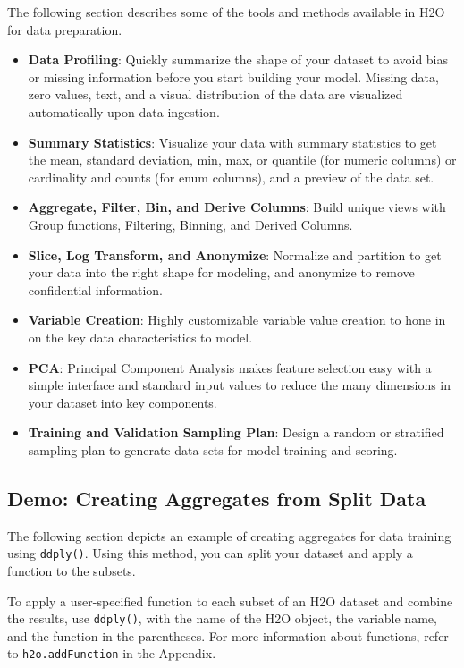 The following section describes some of the tools and methods available in H2O for data preparation. 
\begin{itemize}
\item {\textbf{Data Profiling}}: Quickly summarize the shape of your dataset to avoid bias or missing information before you start building your model. Missing data, zero values, text, and a visual distribution of the data are visualized automatically upon data ingestion. 
\item {\textbf{Summary Statistics}}: Visualize your data with summary statistics to get the mean, standard deviation, min, max, or quantile (for numeric columns) or cardinality and counts (for enum columns), and a preview of the data set. 
\item {\textbf{Aggregate, Filter, Bin, and Derive Columns}}: Build unique views with Group functions, Filtering, Binning, and Derived Columns. 
\item {\textbf{Slice, Log Transform, and Anonymize}}: Normalize and partition to get your data into the right shape for modeling, and anonymize to remove confidential information. 
\item {\textbf{Variable Creation}}: Highly customizable variable value creation to hone in on the key data characteristics to model. 
\item {\textbf{PCA}}: Principal Component Analysis makes feature selection easy with a simple interface and standard input values to reduce the many dimensions in your dataset into key components. 
\item {\textbf{Training and Validation Sampling Plan}}: Design a random or stratified sampling plan to generate data sets for model training and scoring. 
\end{itemize}

\subsection{Demo: Creating Aggregates from Split Data}

The following section depicts an example of creating aggregates for data training using {\texttt{ddply()}}. Using this method, you can split your dataset and apply a function to the subsets.

To apply a user-specified function to each subset of an H2O dataset and combine the results, use {\texttt{ddply()}}, with the name of the H2O object, the variable name, and the function in the parentheses. For more information about functions, refer to {\texttt{h2o.addFunction}} in the Appendix.

